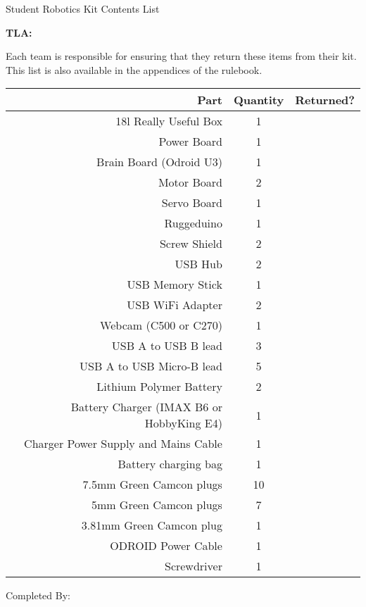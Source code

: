 \documentclass[a4paper, 12pt]{article}
\begin{document}
\begin{center}

    {\huge{Student Robotics Kit Contents List}}

    \medskip

\end{center}

\textbf{TLA:} \hrulefill

\medskip

Each team is responsible for ensuring that they return these items from their kit. This list is also available in the appendices of the rulebook.

\begin{center}
\begin{table}[h]
\def\arraystretch{1.5}
\begin{tabularx}{\textwidth}{|r|c|X|}
\hline
    \textbf{Part} & \textbf{Quantity} & \textbf{Returned?} \\
\hline
 18l Really Useful Box & 1 & \\ \hline

 Power Board & 1 & \\ \hline
 Brain Board (Odroid U3) & 1 & \\ \hline
 Motor Board & 2 & \\ \hline
 Servo Board & 1 & \\ \hline
 Ruggeduino & 1 & \\ \hline
 Screw Shield & 2 & \\ \hline

 USB Hub & 2 & \\ \hline
 USB Memory Stick & 1 & \\ \hline
 USB WiFi Adapter & 2 & \\ \hline
 Webcam (C500 or C270) & 1 & \\ \hline
 USB A to USB B lead & 3 & \\ \hline
 USB A to USB Micro-B lead & 5 & \\ \hline

 Lithium Polymer Battery & 2 & \\ \hline
 Battery Charger (IMAX B6 or HobbyKing E4) & 1 & \\ \hline
 Charger Power Supply and Mains Cable & 1 & \\ \hline
 Battery charging bag & 1 & \\ \hline

 7.5mm Green Camcon plugs & 10 & \\ \hline
 5mm Green Camcon plugs & 7 & \\ \hline
 3.81mm Green Camcon plug & 1 & \\ \hline
 ODROID Power Cable & 1 & \\ \hline
Screwdriver & 1 & \\ \hline
\end{tabularx}
\end{table}
\end{center}

Completed By: \hrulefill
\end{document}
